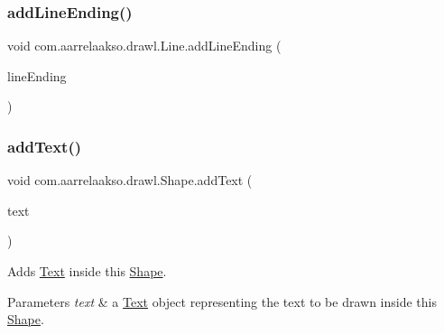\mbox{\label{classcom_1_1aarrelaakso_1_1drawl_1_1_line_ae596a9a32b970e2b5157db03dc023afc}} 
\subsubsection{\texorpdfstring{add\+Line\+Ending()}{addLineEnding()}}
{\footnotesize\ttfamily void com.\+aarrelaakso.\+drawl.\+Line.\+add\+Line\+Ending (\begin{DoxyParamCaption}\item[{final \hyperlink{classcom_1_1aarrelaakso_1_1drawl_1_1_line_ending}{Line\+Ending}}]{line\+Ending }\end{DoxyParamCaption})}

\mbox{\label{classcom_1_1aarrelaakso_1_1drawl_1_1_shape_af6fea9610721de462c18ee640043aba7}} 
\subsubsection{\texorpdfstring{add\+Text()}{addText()}}
{\footnotesize\ttfamily void com.\+aarrelaakso.\+drawl.\+Shape.\+add\+Text (\begin{DoxyParamCaption}\item[{@Nullable final \hyperlink{classcom_1_1aarrelaakso_1_1drawl_1_1_text}{Text}}]{text }\end{DoxyParamCaption})\hspace{0.3cm}{\ttfamily [inherited]}}



Adds \hyperlink{classcom_1_1aarrelaakso_1_1drawl_1_1_text}{Text} inside this \hyperlink{classcom_1_1aarrelaakso_1_1drawl_1_1_shape}{Shape}. 


\begin{DoxyParams}{Parameters}
{\em text} & a \hyperlink{classcom_1_1aarrelaakso_1_1drawl_1_1_text}{Text} object representing the text to be drawn inside this \hyperlink{classcom_1_1aarrelaakso_1_1drawl_1_1_shape}{Shape}. \\
\hline
\end{DoxyParams}
\mbox{\label{classcom_1_1aarrelaakso_1_1drawl_1_1_line_ae037bf2dd2bb2a21ba2d45a752cad9f5}} 
